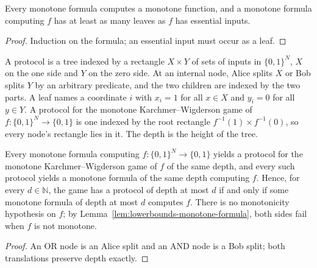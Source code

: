 \begin{lemma}
  \label{lem:lowerbounds-monotone-formula}
  \leanok
  Every monotone formula computes a monotone function, and a monotone formula
  computing $f$ has at least as many leaves as $f$ has essential inputs.
\end{lemma}
\begin{proof}
  \leanok
  Induction on the formula; an essential input must occur as a leaf.
\end{proof}

\begin{definition}
  \label{def:lowerbounds-kw}
  \leanok
  A protocol is a tree indexed by a rectangle $X \times Y$ of sets of inputs in
  $\{0,1\}^N$, $X$ on the one side and $Y$ on the zero side. At an internal
  node, Alice splits $X$ or Bob splits $Y$ by an arbitrary predicate, and the
  two children are indexed by the two parts. A leaf names a coordinate $i$ with
  $x_i = 1$ for all $x \in X$ and $y_i = 0$ for all $y \in Y$. A protocol for
  the monotone Karchmer--Wigderson game of $f : \{0,1\}^N \to \{0,1\}$ is one
  indexed by the root rectangle $f^{-1}(1) \times f^{-1}(0)$, so every node's
  rectangle lies in it. The depth is the height of the tree.
\end{definition}

\begin{theorem}
  \label{thm:lowerbounds-kw}
  \leanok
  Every monotone formula computing $f : \{0,1\}^N \to \{0,1\}$ yields a
  protocol for the monotone Karchmer--Wigderson game of $f$ of the same depth,
  and every such protocol yields a monotone formula of the same depth computing
  $f$. Hence, for every $d \in \mathbb{N}$, the game has a protocol of depth at
  most $d$ if and only if some monotone formula of depth at most $d$ computes
  $f$. There is no monotonicity hypothesis on $f$; by
  Lemma~\ref{lem:lowerbounds-monotone-formula}, both sides fail when $f$ is not
  monotone.
\end{theorem}
\begin{proof}
  \leanok
  An OR node is an Alice split and an AND node is a Bob split; both
  translations preserve depth exactly.
\end{proof}

